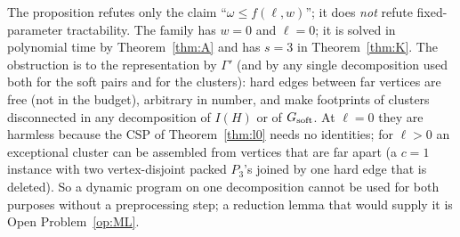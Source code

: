 \begin{remark}\label{rem:expscope}
The proposition refutes only the claim ``$\omega\le f(\ell,w)$''; it does \emph{not} refute fixed-parameter tractability. The family has $w=0$ and $\ell=0$; it is solved in polynomial time by Theorem~\ref{thm:A} and has $s=3$ in Theorem~\ref{thm:K}. The obstruction is to the representation by $\Gamma'$ (and by any single decomposition used both for the soft pairs and for the clusters): hard edges between far vertices are free (not in the budget), arbitrary in number, and make footprints of clusters disconnected in any decomposition of $I(H)$ or of $G_{\mathrm{soft}}$. At $\ell=0$ they are harmless because the CSP of Theorem~\ref{thm:l0} needs no identities; for $\ell>0$ an exceptional cluster can be assembled from vertices that are far apart (a $c=1$ instance with two vertex-disjoint packed $P_3$'s joined by one hard edge that is deleted). So a dynamic program on one decomposition cannot be used for both purposes without a preprocessing step; a reduction lemma that would supply it is Open Problem~\ref{op:ML}.
\end{remark}
